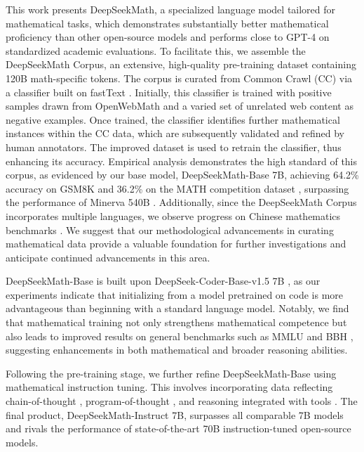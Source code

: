 This work presents DeepSeekMath, a specialized language model tailored for mathematical tasks, which demonstrates substantially better mathematical proficiency than other open-source models and performs close to GPT-4 on standardized academic evaluations. To facilitate this, we assemble the DeepSeekMath Corpus, an extensive, high-quality pre-training dataset containing 120B math-specific tokens. The corpus is curated from Common Crawl (CC) via a classifier built on fastText \citep{joulin2016fasttext}. Initially, this classifier is trained with positive samples drawn from OpenWebMath \citep{openwebmath} and a varied set of unrelated web content as negative examples. Once trained, the classifier identifies further mathematical instances within the CC data, which are subsequently validated and refined by human annotators. The improved dataset is used to retrain the classifier, thus enhancing its accuracy. Empirical analysis demonstrates the high standard of this corpus, as evidenced by our base model, DeepSeekMath-Base 7B, achieving 64.2\% accuracy on GSM8K \citep{gsm8k} and 36.2\% on the MATH competition dataset \citep{MATH}, surpassing the performance of Minerva 540B \citep{minerva}. Additionally, since the DeepSeekMath Corpus incorporates multiple languages, we observe progress on Chinese mathematics benchmarks \citep{wei2023cmath,agieval}. We suggest that our methodological advancements in curating mathematical data provide a valuable foundation for further investigations and anticipate continued advancements in this area.

DeepSeekMath-Base is built upon DeepSeek-Coder-Base-v1.5 7B \citep{deepseek-coder}, as our experiments indicate that initializing from a model pretrained on code is more advantageous than beginning with a standard language model. Notably, we find that mathematical training not only strengthens mathematical competence but also leads to improved results on general benchmarks such as MMLU \citep{mmlu} and BBH \citep{bbh}, suggesting enhancements in both mathematical and broader reasoning abilities.

Following the pre-training stage, we further refine DeepSeekMath-Base using mathematical instruction tuning. This involves incorporating data reflecting chain-of-thought \citep{cot}, program-of-thought \citep{pot,pal}, and reasoning integrated with tools \citep{tora}. The final product, DeepSeekMath-Instruct 7B, surpasses all comparable 7B models and rivals the performance of state-of-the-art 70B instruction-tuned open-source models.

